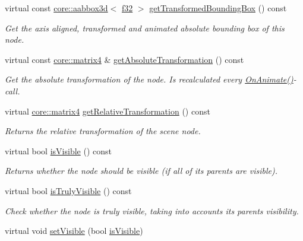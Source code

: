 \begin{DoxyCompactItemize}
virtual const \hyperlink{classirr_1_1core_1_1aabbox3d}{core\+::aabbox3d}$<$ \hyperlink{namespaceirr_a0277be98d67dc26ff93b1a6a1d086b07}{f32} $>$ \hyperlink{classirr_1_1scene_1_1ISceneNode_a77746edcc479107067fbf1f4471ab412}{get\+Transformed\+Bounding\+Box} () const
\begin{DoxyCompactList}\small\item\em Get the axis aligned, transformed and animated absolute bounding box of this node. \end{DoxyCompactList}\item 
virtual const \hyperlink{namespaceirr_1_1core_a73fa92e638c5ca97efd72da307cc9b65}{core\+::matrix4} \& \hyperlink{classirr_1_1scene_1_1ISceneNode_af13dc546a7be796cc0868a2eec51e508}{get\+Absolute\+Transformation} () const
\begin{DoxyCompactList}\small\item\em Get the absolute transformation of the node. Is recalculated every \hyperlink{classirr_1_1scene_1_1ISceneNode_afc1dcb5cb19116d0c7aa3d4ebdf04cc5}{On\+Animate()}-\/call. \end{DoxyCompactList}\item 
virtual \hyperlink{namespaceirr_1_1core_a73fa92e638c5ca97efd72da307cc9b65}{core\+::matrix4} \hyperlink{classirr_1_1scene_1_1ISceneNode_ac7c47ec49174315af83cf5f5d24edb24}{get\+Relative\+Transformation} () const
\begin{DoxyCompactList}\small\item\em Returns the relative transformation of the scene node. \end{DoxyCompactList}\item 
virtual bool \hyperlink{classirr_1_1scene_1_1ISceneNode_a9e8e4e8be0055e8182eb26b055abf339}{is\+Visible} () const
\begin{DoxyCompactList}\small\item\em Returns whether the node should be visible (if all of its parents are visible). \end{DoxyCompactList}\item 
virtual bool \hyperlink{classirr_1_1scene_1_1ISceneNode_a457fda8e5bca28a1c7af1691fefd4f75}{is\+Truly\+Visible} () const
\begin{DoxyCompactList}\small\item\em Check whether the node is truly visible, taking into accounts its parents\textquotesingle{} visibility. \end{DoxyCompactList}\item 
virtual void \hyperlink{classirr_1_1scene_1_1ISceneNode_a2e3a88fe87d11caa7986a203afe6838c}{set\+Visible} (bool \hyperlink{classirr_1_1scene_1_1ISceneNode_a9e8e4e8be0055e8182eb26b055abf339}{is\+Visible})

\end{DoxyCompactItemize}

